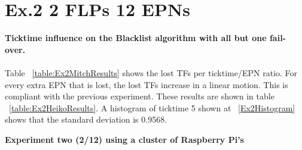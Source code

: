 \section{Ex.2 2 FLPs 12 EPNs}
\textbf{Ticktime influence on the Blacklist algorithm with all but one fail-over.}
\\~\\
Table ~\ref{table:Ex2MitchResults} shows the lost TFs per ticktime/EPN ratio. For every extra EPN that is lost, the lost TFs increase in a linear motion. This is compliant with the previous experiment. These results are shown in table ~\ref{table:Ex2HeikoResults}. A histogram of ticktime 5 shown at ~\ref{Ex2Histogram} shows that the standard deviation is 0.9568.

\begin{table}[h!]
\caption*{\textbf{Experiment two (2/12) using a cluster of Raspberry Pi's}}
\caption{Cumulative lost TFs by ticktime/EPN ratio with a flat sample size for the Blacklist algorithm}
\label{table:Ex2MitchResults}
\end{table}

